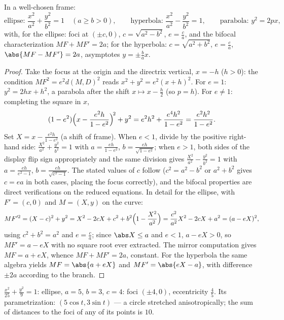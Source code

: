 \begin{theorem}\label{thm:b1:curves:reduced}
In a well-chosen  frame:
\[
\text{ellipse: } \frac{x^2}{a^2} + \frac{y^2}{b^2} = 1
\quad (a \geq b > 0),
\qquad
\text{hyperbola: } \frac{x^2}{a^2} - \frac{y^2}{b^2} = 1,
\qquad
\text{parabola: } y^2 = 2px,
\]
with, for the ellipse: foci at $(\pm c, 0)$, $c = \sqrt{a^2 - b^2}$,
$e = \frac ca$, and the bifocal characterization $MF + MF' = 2a$;
for the hyperbola: $c = \sqrt{a^2 + b^2}$, $e = \frac ca$,
$\abs{MF - MF'} = 2a$, asymptotes $y = \pm\frac ba x$.
\end{theorem}

\begin{proof}
Take the focus at the origin and the directrix vertical, $x = -h$
($h > 0$): the condition $MF^2 = e^2 d(M, D)^2$ reads $x^2 + y^2 =
e^2 (x + h)^2$. For $e = 1$: $y^2 = 2hx + h^2$, a parabola after the
shift $x \mapsto x - \frac h2$ (so $p = h$). For $e \neq 1$:
completing the square in $x$,
\[
(1 - e^2)\Bigl(x - \frac{e^2 h}{1 - e^2}\Bigr)^{\!2} + y^2
= e^2h^2 + \frac{e^4 h^2}{1 - e^2}
= \frac{e^2 h^2}{1 - e^2} .
\]
Set $X = x - \frac{e^2h}{1-e^2}$ (a shift of frame). When $e < 1$,
divide by the positive right-hand side:
$\frac{X^2}{a^2} + \frac{y^2}{b^2} = 1$ with $a = \frac{eh}{1 -
e^2}$, $b = \frac{eh}{\sqrt{1-e^2}}$; when $e > 1$, both sides of
the display flip sign appropriately and the same division gives
$\frac{X^2}{a^2} - \frac{y^2}{b^2} = 1$ with $a = \frac{eh}{e^2 -
1}$, $b = \frac{eh}{\sqrt{e^2 - 1}}$. The stated values of $c$
follow ($c^2 = a^2 - b^2$ or $a^2 + b^2$ gives $c = ea$ in both
cases, placing the focus correctly), and the bifocal properties are
direct verifications on the reduced equations. In detail for the
ellipse, with $F' = (c, 0)$ and $M = (X, y)$ on the curve:
\[
MF'^2 = (X - c)^2 + y^2
= X^2 - 2cX + c^2 + b^2\Bigl(1 - \frac{X^2}{a^2}\Bigr)
= \frac{c^2}{a^2}X^2 - 2cX + a^2
= (a - eX)^2 ,
\]
using $c^2 + b^2 = a^2$ and $e = \frac ca$; since $\abs X \leq
a$ and $e < 1$, $a - eX > 0$, so $MF' = a - eX$ with no square
root ever extracted. The mirror computation gives $MF = a + eX$,
whence $MF + MF' = 2a$, constant. For the hyperbola the same
algebra yields $MF = \abs{a + eX}$ and $MF' = \abs{eX - a}$,
with difference $\pm2a$ according to the branch.
\end{proof}

\begin{example}\label{ex:b1:curves:conicexample}
$\frac{x^2}{25} + \frac{y^2}{9} = 1$: ellipse, $a = 5$, $b = 3$, $c
= 4$: foci $(\pm4, 0)$, eccentricity $\frac45$. Its parametrization:
$(5\cos t, 3\sin t)$ --- a circle stretched anisotropically; the
sum of distances to the foci of any of its points is $10$.
\end{example}

